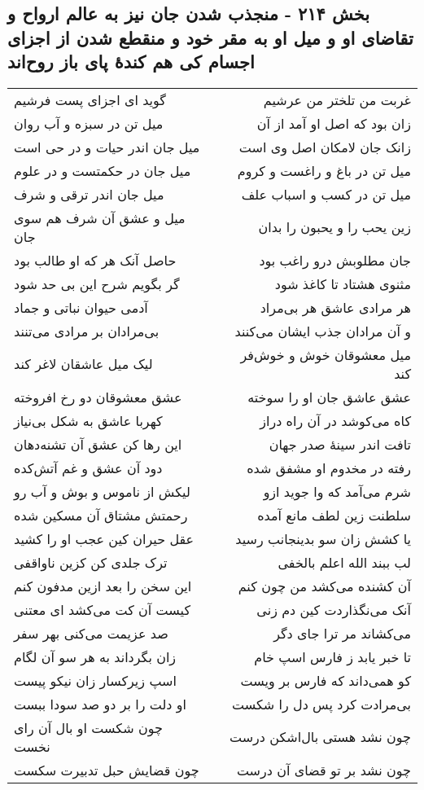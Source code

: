 \begin{center}
\section*{بخش ۲۱۴ - منجذب شدن جان نیز به عالم ارواح و تقاضای او و میل او به مقر خود و منقطع شدن از اجزای اجسام کی هم کندهٔ پای باز روح‌اند}
\label{sec:sh214}
\begin{longtable}{l p{0.5cm} r}
گوید ای اجزای پست فرشیم
&&
غربت من تلختر من عرشیم
\\
میل تن در سبزه و آب روان
&&
زان بود که اصل او آمد از آن
\\
میل جان اندر حیات و در حی است
&&
زانک جان لامکان اصل وی است
\\
میل جان در حکمتست و در علوم
&&
میل تن در باغ و راغست و کروم
\\
میل جان اندر ترقی و شرف
&&
میل تن در کسب و اسباب علف
\\
میل و عشق آن شرف هم سوی جان
&&
زین یحب را و یحبون را بدان
\\
حاصل آنک هر که او طالب بود
&&
جان مطلوبش درو راغب بود
\\
گر بگویم شرح این بی حد شود
&&
مثنوی هشتاد تا کاغذ شود
\\
آدمی حیوان نباتی و جماد
&&
هر مرادی عاشق هر بی‌مراد
\\
بی‌مرادان بر مرادی می‌تنند
&&
و آن مرادان جذب ایشان می‌کنند
\\
لیک میل عاشقان لاغر کند
&&
میل معشوقان خوش و خوش‌فر کند
\\
عشق معشوقان دو رخ افروخته
&&
عشق عاشق جان او را سوخته
\\
کهربا عاشق به شکل بی‌نیاز
&&
کاه می‌کوشد در آن راه دراز
\\
این رها کن عشق آن تشنه‌دهان
&&
تافت اندر سینهٔ صدر جهان
\\
دود آن عشق و غم آتش‌کده
&&
رفته در مخدوم او مشفق شده
\\
لیکش از ناموس و بوش و آب رو
&&
شرم می‌آمد که وا جوید ازو
\\
رحمتش مشتاق آن مسکین شده
&&
سلطنت زین لطف مانع آمده
\\
عقل حیران کین عجب او را کشید
&&
یا کشش زان سو بدینجانب رسید
\\
ترک جلدی کن کزین ناواقفی
&&
لب ببند الله اعلم بالخفی
\\
این سخن را بعد ازین مدفون کنم
&&
آن کشنده می‌کشد من چون کنم
\\
کیست آن کت می‌کشد ای معتنی
&&
آنک می‌نگذاردت کین دم زنی
\\
صد عزیمت می‌کنی بهر سفر
&&
می‌کشاند مر ترا جای دگر
\\
زان بگرداند به هر سو آن لگام
&&
تا خبر یابد ز فارس اسپ خام
\\
اسپ زیرکسار زان نیکو پیست
&&
کو همی‌داند که فارس بر ویست
\\
او دلت را بر دو صد سودا ببست
&&
بی‌مرادت کرد پس دل را شکست
\\
چون شکست او بال آن رای نخست
&&
چون نشد هستی بال‌اشکن درست
\\
چون قضایش حبل تدبیرت سکست
&&
چون نشد بر تو قضای آن درست
\\
\end{longtable}
\end{center}
